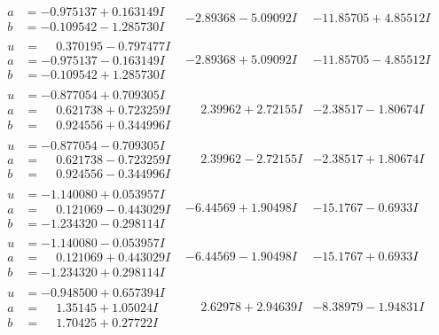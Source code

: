 \documentclass[1p]{elsarticle_modified}
\theoremstyle{definition}
\begin{document}
$$\begin{array}{c|c|c}
\begin{aligned}
a &= -0.975137 + 0.163149 I \\
b &= -0.109542 - 1.285730 I\end{aligned}
 & -2.89368 - 5.09092 I & -11.85705 + 4.85512 I \\ \hline\begin{aligned}
u &= \phantom{-}0.370195 - 0.797477 I \\
a &= -0.975137 - 0.163149 I \\
b &= -0.109542 + 1.285730 I\end{aligned}
 & -2.89368 + 5.09092 I & -11.85705 - 4.85512 I \\ \hline\begin{aligned}
u &= -0.877054 + 0.709305 I \\
a &= \phantom{-}0.621738 + 0.723259 I \\
b &= \phantom{-}0.924556 + 0.344996 I\end{aligned}
 & \phantom{-}2.39962 + 2.72155 I & -2.38517 - 1.80674 I \\ \hline\begin{aligned}
u &= -0.877054 - 0.709305 I \\
a &= \phantom{-}0.621738 - 0.723259 I \\
b &= \phantom{-}0.924556 - 0.344996 I\end{aligned}
 & \phantom{-}2.39962 - 2.72155 I & -2.38517 + 1.80674 I \\ \hline\begin{aligned}
u &= -1.140080 + 0.053957 I \\
a &= \phantom{-}0.121069 - 0.443029 I \\
b &= -1.234320 - 0.298114 I\end{aligned}
 & -6.44569 + 1.90498 I & -15.1767 - 0.6933 I \\ \hline\begin{aligned}
u &= -1.140080 - 0.053957 I \\
a &= \phantom{-}0.121069 + 0.443029 I \\
b &= -1.234320 + 0.298114 I\end{aligned}
 & -6.44569 - 1.90498 I & -15.1767 + 0.6933 I \\ \hline\begin{aligned}
u &= -0.948500 + 0.657394 I \\
a &= \phantom{-}1.35145 + 1.05024 I \\
b &= \phantom{-}1.70425 + 0.27722 I\end{aligned}
 & \phantom{-}2.62978 + 2.94639 I & -8.38979 - 1.94831 I \\ \hline\begin{aligned}

\end{aligned}
\end{array}$$
\end{document}
